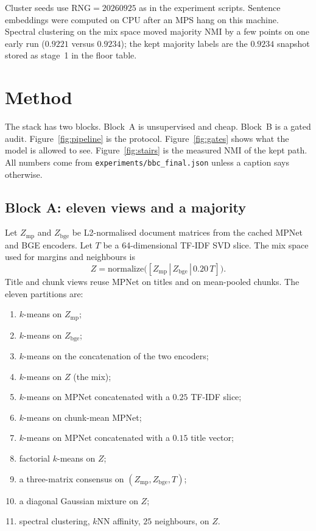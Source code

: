 \documentclass[11pt,a4paper]{article}
\begin{document}
Cluster seeds use $\mathrm{RNG}=20260925$ as in the experiment
scripts. Sentence embeddings were computed on CPU after an MPS
hang on this machine. Spectral clustering on the mix space
moved majority NMI by a few points on one early run
($0.9221$ versus $0.9234$); the kept majority labels are the
$0.9234$ snapshot stored as stage~1 in the floor table.

\section{Method}

The stack has two blocks. Block~A is unsupervised and cheap.
Block~B is a gated audit. Figure~\ref{fig:pipeline} is the
protocol. Figure~\ref{fig:gates} shows what the model is
allowed to see. Figure~\ref{fig:stairs} is the measured NMI
of the kept path. All numbers come from
\texttt{experiments/bbc\_final.json} unless a caption says
otherwise.

\subsection{Block A: eleven views and a majority}

Let $Z_{\mathrm{mp}}$ and $Z_{\mathrm{bge}}$ be L2-normalised
document matrices from the cached MPNet and BGE encoders.
Let $T$ be a 64-dimensional TF-IDF SVD slice. The mix space
used for margins and neighbours is
\[
Z=\mathrm{normalize}\bigl([Z_{\mathrm{mp}}\,|\,Z_{\mathrm{bge}}\,|\,0.20\,T]\bigr).
\]
Title and chunk views reuse MPNet on titles and on mean-pooled
chunks. The eleven partitions are:

\begin{enumerate}
\item $k$-means on $Z_{\mathrm{mp}}$;
\item $k$-means on $Z_{\mathrm{bge}}$;
\item $k$-means on the concatenation of the two encoders;
\item $k$-means on $Z$ (the mix);
\item $k$-means on MPNet concatenated with a $0.25$ TF-IDF slice;
\item $k$-means on chunk-mean MPNet;
\item $k$-means on MPNet concatenated with a $0.15$ title vector;
\item factorial $k$-means on $Z$;
\item a three-matrix consensus on $(Z_{\mathrm{mp}},Z_{\mathrm{bge}},T)$;
\item a diagonal Gaussian mixture on $Z$;
\item spectral clustering, $k$NN affinity, $25$ neighbours, on $Z$.
\end{enumerate}
\end{document}
